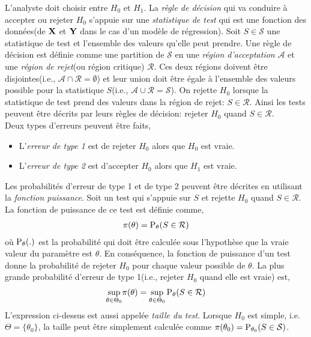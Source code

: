L'analyste doit choisir entre $H_0$ et $H_1$.  La \emph{règle de décision} qui va conduire à accepter ou rejeter $H_0$ s'appuie sur une \emph{statistique de test} qui est une fonction des données(de $\mathbf X$ et $\mathbf Y$ dans le cas d'un modèle de régression). Soit $S\in \mathcal{S}$ une statistique de test et l'ensemble des valeurs qu'elle peut prendre. Une règle de décision est définie comme une partition de $\mathcal{S}$ en une \emph{région d'acceptation} $\mathcal{A}$ et une \emph{région de rejet}(ou région critique) $\mathcal{R}$. Ces deux régions doivent être disjointes(i.e., $\mathcal{A}\cap\mathcal{R} = \emptyset$) et leur union doit être égale à l'ensemble des valeurs possible pour la statistique $S$(i.e.,  $\mathcal{A}\cup\mathcal{R} = \mathcal{S}$). On rejette $H_0$ lorsque la statistique de test prend des valeurs dans la région de rejet: $S\in\mathcal{R}$. Ainsi les tests peuvent être décrits par leurs règles de décision: rejeter $H_0$ quand $S\in\mathcal{R}$.\\
Deux types d'erreurs peuvent être faits,
\begin{itemize}[label = - ]
\item L'\emph{erreur de type 1} est de rejeter $H_0$ alors que $H_0$ est vraie.
\item L'\emph{erreur de type 2} est d'accepter $H_0$ alors que $H_1$ est vraie.
\end{itemize}
Les probabilités d'erreur de type 1 et de type 2 peuvent être décrites en utilisant la \emph{fonction puissance}. Soit un test qui s'appuie sur $S$ et rejette $H_0$ quand $S\in\mathcal{R}$. La fonction de puissance de ce test est définie comme,
\begin{align*}
\pi(\theta) = \operatorname{P}_\theta(S\in \mathcal{R})
\end{align*}
où $\operatorname{P}_\theta(.)$ est la probabilité qui doit être calculée sous l'hypothèse que la vraie valeur du paramètre est $\theta$. En conséquence, la fonction de puissance d'un test donne la probabilité de rejeter $H_0$ pour chaque valeur possible de $\theta$. La plus grande probabilité d'erreur de type 1(i.e., rejeter $H_0$ quand elle est vraie) est,
\begin{align}
\underset{\theta \in \Theta_0}{\sup} \pi(\theta)=\underset{\theta \in \Theta_0}{\sup}\operatorname{P}_\theta(S\in \mathcal{R})
\label{eq47}
\end{align}
L'expression ci-dessus est aussi appelée \emph{taille du test}. Lorsque $H_0$ est simple, i.e. $\Theta = \{\theta_0\}$, la taille peut être simplement calculée comme $\pi(\theta_0) = \operatorname{P}_{\theta_0}(S\in\mathcal{S})$.\\
